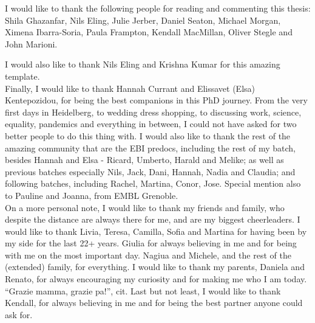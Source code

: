 \begin{acknowledgements}
I would like to thank the following people for reading and commenting this thesis: 
Shila Ghazanfar, 
Nils Eling,
Julie Jerber,
Daniel Seaton,
Michael Morgan,
Ximena Ibarra-Soria,
Paula Frampton,
Kendall MacMillan,
Oliver Stegle and
John Marioni.

I would also like to thank Nils Eling and Krishna Kumar for this amazing template. \\


Finally, I would like to thank Hannah Currant and Elissavet (Elsa) Kentepozidou, for being the best companions in this PhD journey.
From the very first days in Heidelberg, to wedding dress shopping, to discussing work, science, equality, pandemics and everything in between, I could not have asked for two better people to do this thing with.
I would also like to thank the rest of the amazing community that are the EBI predocs, including the rest of my batch, besides Hannah and Elsa - Ricard, Umberto, Harald and Melike; as well as previous batches especially Nils, Jack, Dani, Hannah, Nadia and Claudia; and following batches, including Rachel, Martina, Conor, Jose. 
Special mention also to Pauline and Joanna, from EMBL Grenoble. \\


On a more personal note, I would like to thank my friends and family, who despite the distance are always there for me, and are my biggest cheerleaders.
I would like to thank Livia, Teresa, Camilla, Sofia and Martina for having been by my side for the last 22+ years.
Giulia for always believing in me and for being with me on the most important day.
Nagiua and Michele, and the rest of the (extended) family, for everything.
I would like to thank my parents, Daniela and Renato, for always encouraging my curiosity and for making me who I am today.
“Grazie mamma, grazie pa!”, cit.
Last but not least, I would like to thank Kendall, for always believing in me and for being the best partner anyone could ask for.

\end{acknowledgements}
